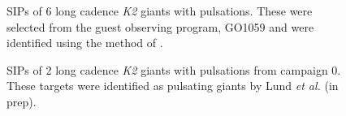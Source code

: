 \documentclass[useAMS, usenatbib, preprint, 12pt]{aastex}
\begin{document}
\begin{figure}
\begin{center}
{        }
    \end{center}
    \caption{SIPs of 6 long cadence {\it K2} giants with pulsations. These
	     were selected from the guest observing program, GO1059 and were
	     identified using the method of \citet{Huber2009}.
\label{fig:astero_examples}}
\end{figure}

\begin{figure}
\begin{center}
    \end{center}
    \caption{SIPs of 2 long cadence {\it K2} giants with
	    pulsations from campaign 0. These targets were identified as
	    pulsating giants by Lund {\it et al.} (in prep).
\label{fig:c0}}
\end{figure}
\end{document}
